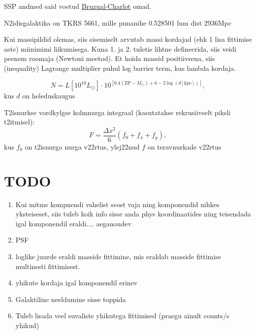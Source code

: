 \documentclass{article}
\begin{document}
	SSP andmed said voetud \href{http://www.bruzual.org/bc03/Updated_version_2016/}{Bruzual-Charlot} omad.
	
	N2idisgalaktika on TKRS 5661, mille punanihe 0.528501 lum dist 2936Mpc
	
	Kui massipildid olemas, siis sisemiselt arvutab massi kordajad (ehk 1 lisa fittimise aste) miinimimi liikumisega. Kuna 1. ja 2. tuletis lihtne defineerida, siis veidi peenem roomaja (Newtoni meetod). Et hoida massid positiivsena, siis (inequality) Lagrange multiplier puhul log barrier term, kus lambda kordaja.
	
	\begin{equation}
		N = L\left[ 10^{10}L_\odot \right] \cdot 10^{\left[ 0.4(\mathrm{ZP}-M_\odot) +6 - 2\log(d[\mathrm{kpc}]) \right]},
	\end{equation}
	kus $d$ on heleduskaugus
	
	T2isnurkse vordkylgse kolmnurga integraal (kasutatakse rekrusiivselt piksli t2itmisel):
	\begin{equation}
		F = \frac{\Delta x^2}{6}(f_0+f_x+f_y),
	\end{equation}
	kus $f_0$ on t2isnurga nurga v22rtus, ylej22nud $f$ on teravnurkade v22rtus
	
	\section{TODO} %
	\label{sec:todo}
	\begin{enumerate}
		\item Kui mitme kompnendi vahelist seost vaja ning komponendid nihkes yksteiseset, siis tuleb koik info sisse anda phys koordinaatides ning teisendada igal komponendil eraldi.... aeganoudev
		\item PSF
		\item loglike juurde eraldi masside fittimine, mis eraldab masside fittimise multinesti fittimisest.
		\item yhikute kordaja igal komponendil erinev
		\item Galaktiline neeldumine sisse toppida
		\item Tuleb lisada veel suvaliste yhikutega fittimised (praegu ainult counts/s yhikud)
	\end{enumerate}
\end{document}
